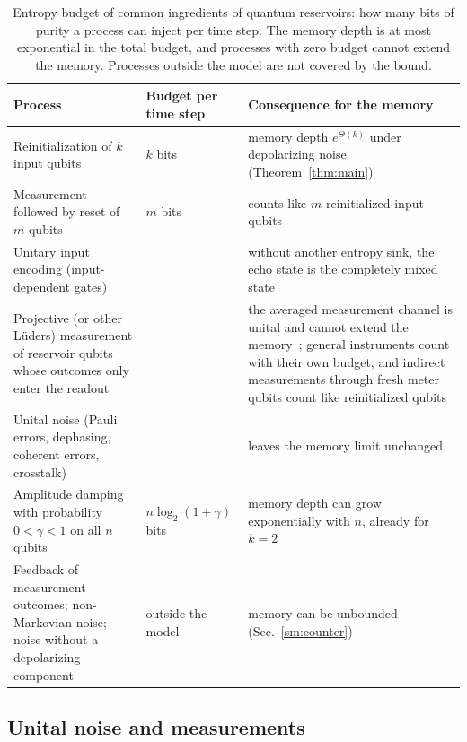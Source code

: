 \documentclass[aps,prl,twocolumn,superscriptaddress,floatfix]{revtex4-2}
\theoremstyle{plain}
\begin{document}
\begin{table}[t]
\caption{Entropy budget of common ingredients of quantum reservoirs: how many bits of purity a process can inject per time step. The memory depth is at most exponential in the total budget, and processes with zero budget cannot extend the memory. Processes outside the model are not covered by the bound.}
\label{tabS:budget}
\begin{ruledtabular}
\begin{tabular}{>{\raggedright\arraybackslash}p{5.3cm}>{\raggedright\arraybackslash}p{2.7cm}>{\raggedright\arraybackslash}p{8.3cm}}
Process & Budget per time step & Consequence for the memory \\ \hline
Reinitialization of $k$ input qubits & $k$ bits & memory depth $e^{\Theta(k)}$ under depolarizing noise (Theorem~\ref{thm:main}) \\
Measurement followed by reset of $m$ qubits & $m$ bits & counts like $m$ reinitialized input qubits~\cite{Yasuda2023,Hu2024} \\
Unitary input encoding (input-dependent gates) & 0 & without another entropy sink, the echo state is the completely mixed state \\
Projective (or other L\"uders) measurement of reservoir qubits whose outcomes only enter the readout & 0 & the averaged measurement channel is unital and cannot extend the memory~\cite{Mujal2023}; general instruments count with their own budget, and indirect measurements through fresh meter qubits count like reinitialized qubits~\cite{MorguiSancho2026} \\
Unital noise (Pauli errors, dephasing, coherent errors, crosstalk) & 0 & leaves the memory limit unchanged \\
Amplitude damping with probability $0<\gamma<1$ on all $n$ qubits & $n\log_2(1+\gamma)$ bits & memory depth can grow exponentially with $n$, already for $k=2$~\cite{BenOr2013,Monzani2024,Freiheit2026} \\
Feedback of measurement outcomes; non-Markovian noise; noise without a depolarizing component & outside the model & memory can be unbounded (Sec.~\ref{sm:counter})~\cite{Sannia2026} \\
\end{tabular}
\end{ruledtabular}
\end{table}

\subsection{Unital noise and measurements}
\end{document}
